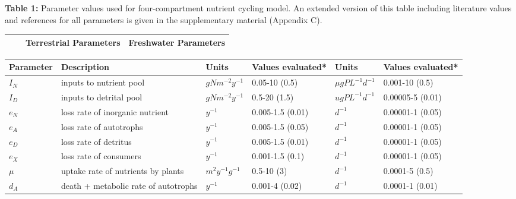 \documentclass[12pt,a4paper,oneside]{article}
\begin{document}
\newpage


\newpage
\noindent \textbf{Table 1:} Parameter values used for four-compartment
nutrient cycling model. An extended version of this table including literature values
and references for all parameters is given in the supplementary
material (Appendix C).
\begin{center}
{\footnotesize 
  \begin{tabular}{ | p{1.5cm} |  p{4cm} | p{4.7cm} || p{4.7cm} | }   
\hline \hline
& & Terrestrial Parameters & Freshwater Parameters \\ \hline
\end{tabular}

  \begin{tabular}{ | p{1.5cm} |  p{4cm} | p{1.75cm} | p{2.5cm} || p{2.25cm} | p{2cm} | }  
\hline 
Parameter & Description & Units  & Values evaluated* & Units & Values evaluated* \\ \hline \hline

\(I_{N}\) & inputs to nutrient pool & \(gNm^{-2}y^{-1}\) & 0.05-10 (0.5) & \(\mu gPL^{-1}d^{-1}\) & 0.001-10 (0.5)\\ \hline

\(I_{D}\) & inputs to detrital pool & \(gNm^{-2}y^{-1}\) & 0.5-20 (1.5)& \(ugPL^{-1}d^{-1}\)  & 0.00005-5 (0.01) \\\hline

\(e_{N}\) &loss rate of inorganic nutrient&\(y^{-1}\) & 	0.005-1.5 (0.01) &	\(d^{-1}\)	&  0.00001-1 (0.05)\\\hline

\(e_{A}\) & loss rate of autotrophs & \(y^{-1}\)&  0.005-1.5 (0.05) & \(d^{-1}\) & 0.00001-1 (0.05)\\\hline

\(e_{D}\) & loss rate of detritus & \(y^{-1}\) & 0.005-1.5 (0.01) & \(d^{-1}\)  & 0.00001-1 (0.05)\\\hline

\(e_{X}\) & loss rate of consumers & \(y^{-1}\)  & 0.001-1.5 (0.1) & \(d^{-1}\) & 0.00001-1 (0.05)\\\hline

\(\mu\) & uptake rate of nutrients by plants & \(m^2y^{-1}g^{-1}\) & 0.5-10 (3) & \(d^{-1}\)  & 0.0001-5 (0.5)\\\hline

\(d_{A}\) & death + metabolic rate of autotrophs & \(y^{-1}\)  & 0.001-4 (0.02) & \(d^{-1}\)  & 0.0001-1 (0.01)\\\hline


\end{tabular}}
\end{center}
\end{document}
